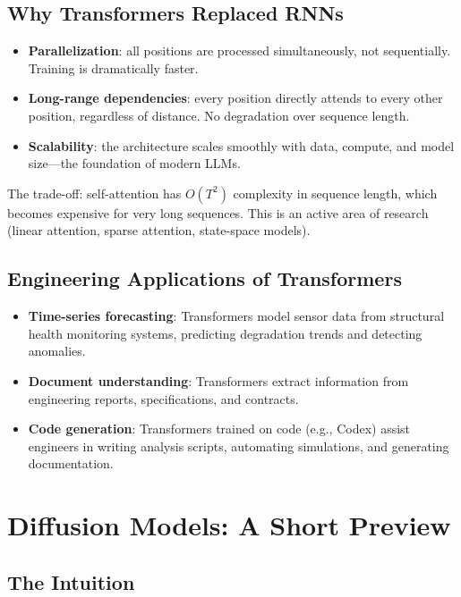 \documentclass[12pt]{article}
\begin{document}
\subsection{Why Transformers Replaced RNNs}

\begin{itemize}
    \item \textbf{Parallelization}: all positions are processed simultaneously, not sequentially. Training is dramatically faster.
    \item \textbf{Long-range dependencies}: every position directly attends to every other position, regardless of distance. No degradation over sequence length.
    \item \textbf{Scalability}: the architecture scales smoothly with data, compute, and model size---the foundation of modern LLMs.
\end{itemize}

The trade-off: self-attention has $O(T^2)$ complexity in sequence length, which becomes expensive for very long sequences. This is an active area of research (linear attention, sparse attention, state-space models).

\subsection{Engineering Applications of Transformers}

\begin{itemize}
    \item \textbf{Time-series forecasting}: Transformers model sensor data from structural health monitoring systems, predicting degradation trends and detecting anomalies.
    \item \textbf{Document understanding}: Transformers extract information from engineering reports, specifications, and contracts.
    \item \textbf{Code generation}: Transformers trained on code (e.g., Codex) assist engineers in writing analysis scripts, automating simulations, and generating documentation.
\end{itemize}

\section{Diffusion Models: A Short Preview}

\subsection{The Intuition}
\end{document}
